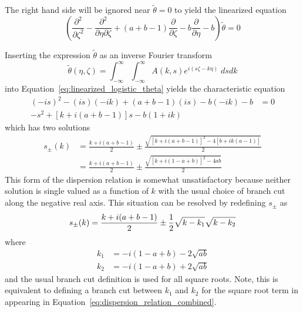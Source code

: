\documentclass[12pt]{amsart}
\begin{document}
The right hand side will be ignored near $\tilde{\theta}=0$ to yield the linearized equation
\begin{equation}
    \left(
    \frac{\partial^2}{\partial\zeta^2} -
    \frac{\partial^2}{\partial\eta\partial\zeta} +
    (a+b-1)\frac{\partial}{\partial\zeta} -
    b\frac{\partial}{\partial\eta}-b
    \right)\tilde{\theta} = 0
  \label{eq:linearized_logistic_theta}    
\end{equation}

Inserting the expression $\tilde{\theta}$ as an inverse Fourier transform
\begin{equation}
  \tilde{\theta}(\eta, \zeta) = \int_{-\infty}^{\infty}\int_{-\infty}^{\infty} A(k, s) e^{i(s\zeta-k\eta)} \; ds dk
\end{equation}
into Equation~\ref{eq:linearized_logistic_theta} yields the characteristic equation
\begin{align}
  (-is)^2-(is)(-ik)+(a+b-1)(is)-b(-ik)-b &= 0 \\
  -s^2+\left[k+i(a+b-1)\right]s -b(1+ik) 
\end{align}
which has two solutions 
\begin{align}
  s_{\pm}(k)
  & = \frac{k + i(a+b-1)}{2} \pm \frac{\sqrt{\left[k + i(a+b-1)\right]^2-4\left[b+ik(a-1)\right]}}{2} \\
  & = \frac{k + i(a+b-1)}{2} \pm \frac{\sqrt{\left[k + i(1-a+b)\right]^2-4ab}}{2}
  \label{eq:dispersion_relation_combined}
\end{align}
This form of the dispersion relation is somewhat unsatisfactory
because neither solution is single valued as a function of $k$ with
the usual choice of branch cut along the negative real axis.  This 
situation can be resolved by redefining $s_{\pm}$ as
\begin{equation}
  s_{\pm}(k) = \frac{k + i(a+b-1)}{2} \pm \frac{1}{2}\sqrt{k - k_1}\sqrt{k - k_2} \\
  \label{eq:dispersion_relation_separated}
\end{equation}
where
\begin{align}
  k_1 & = -i(1-a+b)-2\sqrt{ab} \\
  k_2 & = -i(1-a+b)+2\sqrt{ab}   
\end{align}
and the usual branch cut definition is used for all square roots.
Note, this is equivalent to defining a branch cut between $k_1$ and
$k_2$ for the square root term in appearing in
Equation~\ref{eq:dispersion_relation_combined}.

\end{document}
